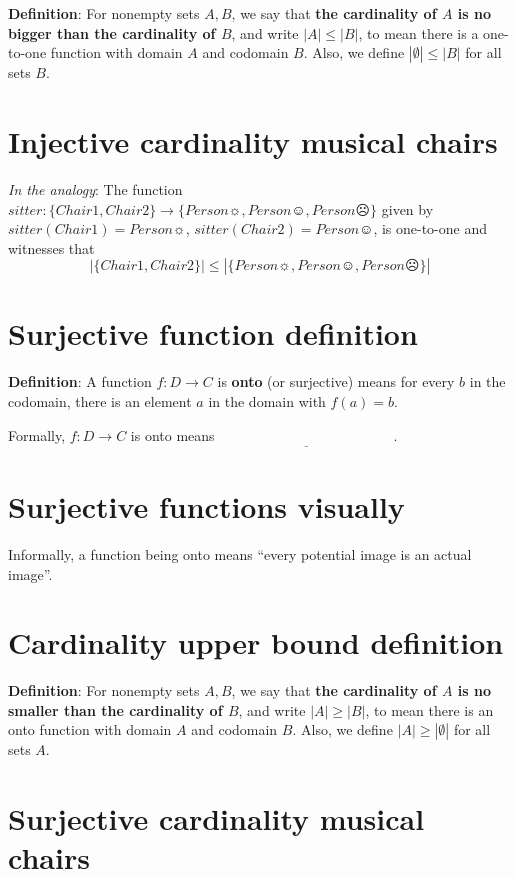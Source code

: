 \documentclass[12pt, oneside]{article}
\begin{document}
{\bf Definition}:  For nonempty sets $A, B$, we say that {\bf the  cardinality of $A$ is  no  bigger than the cardinality of $B$}, 
and write $|A| \leq |B|$, to mean there is a  one-to-one function  with domain $A$  and codomain $B$.
Also, we define $|\emptyset| \leq |B|$ for all sets $B$. \vfill
\section*{Injective cardinality musical chairs}


{\it In the analogy}: The function $sitter: \{ Chair1, Chair2\} \to \{ Person\sun, Person\smiley, Person\frownie \}$ given
by $sitter(Chair1) = Person\sun$,  $sitter(Chair2) = Person\smiley$, is one-to-one and witnesses that 
\[
| \{ Chair1, Chair2\} | \leq |\{ Person\sun, Person\smiley, Person\frownie \}|
\] \vfill
\section*{Surjective function definition}


{\bf Definition}: A function $f: D  \to C$ is {\bf onto} (or  surjective) means for every $b$ in the codomain, 
there  is an element $a$ in the domain with  $f(a) = b$.

Formally, $f: D  \to  C$ is  onto  means $\underline{\phantom{\forall b \in C  \exists a \in D ( f(a) = b)}}$.
 \vfill
\section*{Surjective functions visually}


Informally, a function being onto means ``every potential image is an actual image''.

\phantom{Draw finite domain, finite codomain picture with duplicate image.}
\vspace{50pt} \vfill
\section*{Cardinality upper bound definition}


{\bf Definition}:  For nonempty sets $A, B$, we say that {\bf the  cardinality of $A$ is  no  smaller than 
the cardinality of  $B$}, and 
write $|A| \geq |B|$, to mean there is an onto function  with domain $A$  and codomain $B$.
Also, we define $|A| \geq |\emptyset|$ for all sets $A$.
 \vfill
\section*{Surjective cardinality musical chairs}
\end{document}
